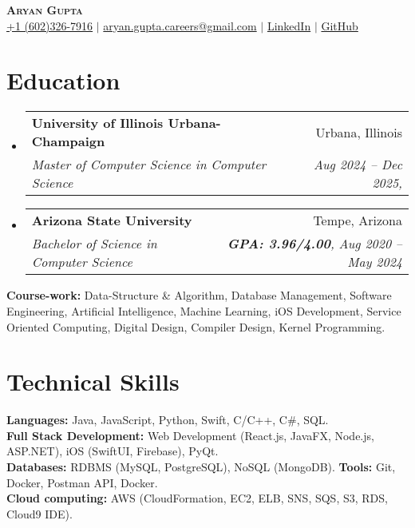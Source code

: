 \documentclass[letterpaper,11pt]{article}
\makeatletter
\newcommand{\resumeEducationHeading}[5]{
  \vspace{-2pt}\item
    \begin{tabular*}{0.97\textwidth}[t]{l@{\extracolsep{\fill}}r}
      \textbf{#1} & #2 \\
      \textit{\small#3} & \textit{\small #4, #5} \\
    \end{tabular*}\vspace{-5pt}
}
\newcommand{\resumeSubHeadingListStart}{\begin{itemize}[leftmargin=0.15in, label={}]}
\newcommand{\resumeSubHeadingListEnd}{\end{itemize}}
\makeatother
\begin{document}
\begin{center}
  \textbf{\Huge \scshape Aryan Gupta} \\ \vspace{3pt}
  \small
  \faMobile \hspace{.5pt} \href{tel:6023267916}{+1 (602)326-7916}
  $|$
  \faAt \hspace{.5pt} \href{mailto:aryan.gupta.careers@gmail.com}{aryan.gupta.careers@gmail.com}
  $|$
  \faLinkedinSquare \hspace{.5pt} \href{https://www.linkedin.com/in/agupt295}{LinkedIn}
  $|$
  \faGithub \hspace{.5pt} \href{https://github.com/agupt295}{GitHub}
\end{center}

\section{Education}
\resumeSubHeadingListStart
  \resumeEducationHeading
    {University of Illinois Urbana-Champaign}{Urbana, Illinois}
    {Master of Computer Science in Computer Science}{Aug 2024 -- Dec 2025}{}{}
\resumeSubHeadingListEnd
\vspace{-0.35cm} %
\resumeSubHeadingListStart
  \resumeEducationHeading
    {Arizona State University}{Tempe, Arizona}
    {Bachelor of Science in Computer Science}{\textbf{GPA: 3.96/4.00}}{Aug 2020 -- May 2024}{}
\resumeSubHeadingListEnd

  \resumeSubHeadingListStart
    \small{\item{
        \textbf{Course-work:}{ Data-Structure \& Algorithm, Database Management, Software Engineering, Artificial Intelligence, Machine Learning, iOS Development, Service Oriented Computing, Digital Design, Compiler Design, Kernel Programming.} \\ \vspace{3pt}
    }}
  \resumeSubHeadingListEnd

\section{Technical Skills}
  \resumeSubHeadingListStart
    \small{\item{
      \textbf{Languages:}{ Java, JavaScript, Python, Swift, C/C++, C\#, SQL. } \\ \vspace{3pt}
      \textbf{Full Stack Development:}{ Web Development (React.js, JavaFX, Node.js, ASP.NET), iOS (SwiftUI, Firebase), PyQt. } \\ \vspace{3pt}
      \textbf{Databases:}{ RDBMS (MySQL, PostgreSQL), NoSQL (MongoDB). }\textbf{Tools:}{ Git, Docker, Postman API, Docker.} \\ \vspace{3pt}
      \textbf{Cloud computing:}{ AWS (CloudFormation, EC2, ELB, SNS, SQS, S3, RDS, Cloud9 IDE).}
    }}
  \resumeSubHeadingListEnd
\end{document}

